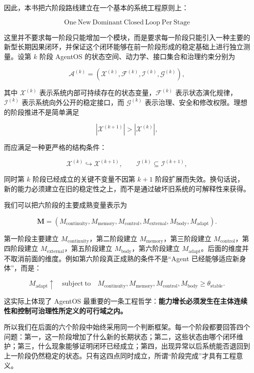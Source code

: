 因此，本书把六阶段路线建立在一个基本的系统工程原则上：

\[
\boxed{
\mathrm{One\ New\ Dominant\ Closed\ Loop\ Per\ Stage}
}
\]

这里并不要求每一阶段只能增加一个模块，而是要求每一阶段只能引入一种主要的新型长期因果闭环，并保证这个闭环能够在前一阶段形成的稳定基础上进行独立测量。设第 \(k\) 阶段 AgentOS 的状态空间、动力学、接口集合和治理约束分别为

\[
\mathcal A^{(k)}
=
\left(
\mathcal X^{(k)},
\mathcal F^{(k)},
\mathcal I^{(k)},
\mathcal G^{(k)}
\right),
\]

其中 \(\mathcal X^{(k)}\) 表示系统内部可持续存在的状态变量，\(\mathcal F^{(k)}\) 表示状态演化规律，\(\mathcal I^{(k)}\) 表示系统向外公开的稳定接口，而 \(\mathcal G^{(k)}\) 表示治理、安全和修改权限。理想的阶段推进不是简单满足

\[
|\mathcal X^{(k+1)}|>|\mathcal X^{(k)}|,
\]

而应满足一种更严格的结构条件：

\[
\mathcal X^{(k)}
\hookrightarrow
\mathcal X^{(k+1)},
\qquad
\mathcal I^{(k)}
\subseteq
\mathcal I^{(k+1)},
\]

同时第 \(k\) 阶段已经成立的关键不变量不因第 \(k+1\) 阶段扩展而失效。换句话说，新的能力必须建立在旧的稳定性之上，而不是通过破坏旧系统的可解释性来获得。

我们可以把六阶段的主要成熟变量表示为

\[
\mathbf M
=
\left(
M_{\mathrm{continuity}},
M_{\mathrm{memory}},
M_{\mathrm{control}},
M_{\mathrm{external}},
M_{\mathrm{body}},
M_{\mathrm{adapt}}
\right).
\]

第一阶段主要建立 \(M_{\mathrm{continuity}}\)，第二阶段建立 \(M_{\mathrm{memory}}\)，第三阶段建立 \(M_{\mathrm{control}}\)，第四阶段建立 \(M_{\mathrm{external}}\)，第五阶段建立 \(M_{\mathrm{body}}\)，第六阶段建立 \(M_{\mathrm{adapt}}\)。后面的维度并不取消前面的维度。例如第六阶段真正成熟的条件不是“Agent 已经能够适应新身体”，而是：

\[
M_{\mathrm{adapt}}\uparrow
\quad
\mathrm{subject\ to}
\quad
M_{\mathrm{continuity}},
M_{\mathrm{memory}},
M_{\mathrm{control}},
M_{\mathrm{body}}
\geq
\theta_{\mathrm{stable}}.
\]

这实际上体现了 AgentOS 最重要的一条工程哲学：\textbf{能力增长必须发生在主体连续性和控制可治理性所定义的可行域之内。}

所以我们在后面的六个阶段中始终采用同一个判断框架。每一个阶段都要回答四个问题：第一，这一阶段增加了什么新的长期状态；第二，这些状态由哪个闭环维护；第三，什么现象能够证明闭环已经成立；第四，出现异常以后系统能否退回到上一阶段仍然稳定的状态。只有这四点同时成立，所谓“阶段完成”才具有工程意义。

